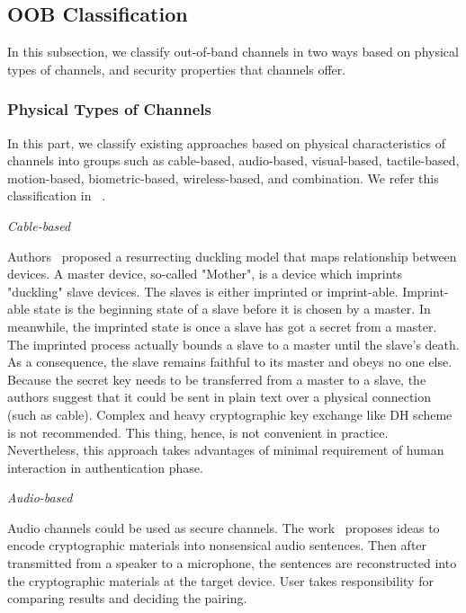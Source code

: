 \subsection{OOB Classification}

In this subsection, we classify out-of-band channels in two ways based on physical types of channels, and security properties that channels offer. 

\subsubsection{Physical Types of Channels}

In this part, we classify existing approaches based on physical characteristics of channels into groups such as cable-based, audio-based, visual-based, tactile-based, motion-based, biometric-based, wireless-based, and combination. We refer this classification in ~\cite{KhanPathanbook}.

\emph{Cable-based}

Authors~\cite{Stajano:2000bs} proposed a resurrecting duckling model that maps relationship between devices. A master device, so-called "Mother", is a device which imprints "duckling" slave devices. The slaves is either imprinted or imprint-able. Imprint-able state is the beginning state of a slave before it is chosen by a master. In meanwhile, the imprinted state is once a slave has got a secret from a master. The imprinted process actually bounds a slave to a master until the slave's death. As a consequence, the slave remains faithful to its master and obeys no one else. Because the secret key needs to be transferred from a master to a slave, the authors suggest that it could be sent in plain text over a physical connection (such as cable). Complex and heavy cryptographic key exchange like DH scheme is not recommended. This thing, hence, is not convenient in practice. Nevertheless, this approach takes advantages of minimal requirement of human interaction in authentication phase. 

\emph{Audio-based}

Audio channels could be used as secure channels. The work~\cite{1648797, Soriente:2008, Lin:2011, Saxena:2008:UDP:1408664.1408672, 5678019, Sigg:2012aa} proposes ideas to encode cryptographic materials into nonsensical audio sentences. Then after transmitted from a speaker to a microphone, the sentences are reconstructed into the cryptographic materials at the target device. User takes responsibility for comparing results and deciding the pairing. 

